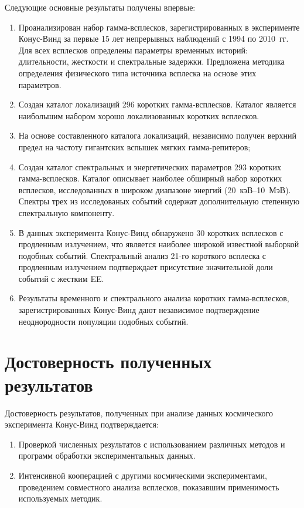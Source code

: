 Следующие основные результаты получены впервые:
\begin{enumerate}
\item Проанализирован набор гамма-всплесков, зарегистрированных в эксперименте 
 Конус-Винд за первые 15 лет непрерывных наблюдений с 1994 по 2010~гг. Для всех 
 всплесков определены параметры временных историй: длительности, жесткости и спектральные задержки.
 Предложена методика определения физического типа источника всплеска на основе этих параметров.
\item Создан каталог локализаций 296 коротких гамма-всплесков. Каталог является 
 наибольшим набором хорошо локализованных коротких всплесков. 
\item На основе составленного каталога локализаций, независимо
 получен верхний предел на частоту гигантских вспышек мягких гамма-репитеров;
\item Создан каталог спектральных и энергетических параметров 293 коротких гамма-всплесков. 
 Каталог описывает наиболее обширный набор коротких всплесков, исследованных 
 в широком диапазоне энергий (20~кэВ--10~МэВ). Спектры трех из исследованых событий 
 содержат дополнительную степенную спектральную компоненту.
\item В данных эксперимента Конус-Винд обнаружено 30 коротких всплесков с продленным излучением, 
что является наиболее широкой известной выборкой подобных событий.
Спектральный анализ 21-го короткого всплеска с продленным излучением подтверждает присутствие значительной доли 
событий с жестким EE.   
\item Результаты временного и спектрального анализа коротких гамма-всплесков, 
 зарегистрированных Конус-Винд дают независимое подтверждение неоднородности популяции подобных событий.
\end{enumerate}

\section*{Достоверность полученных результатов}
Достоверность результатов, полученных при анализе данных космического
эксперимента Конус-Винд подтверждается:
\begin{enumerate}
\item Проверкой численных результатов с использованием различных методов и 
программ обработки экспериментальных данных.
\item Интенсивной кооперацией с другими космическими экспериментами,
проведением совместного анализа всплесков, показавшим применимость используемых методик.
\end{enumerate}

